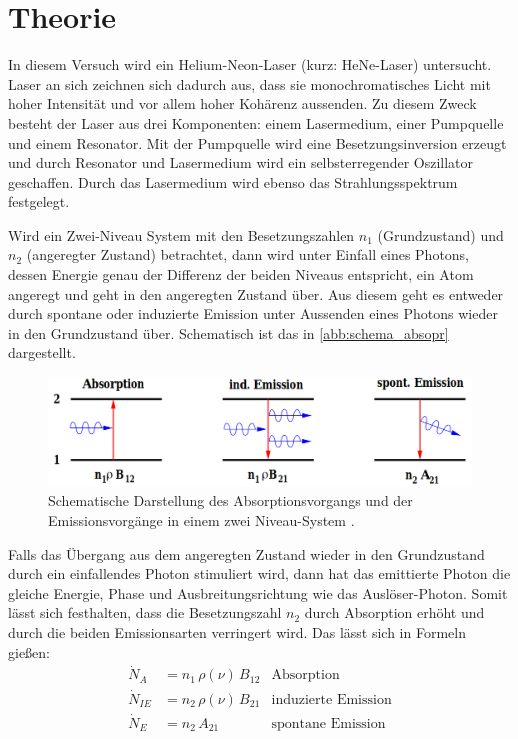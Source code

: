 \section{Theorie}

In diesem Versuch wird ein Helium-Neon-Laser (kurz: HeNe-Laser) untersucht.
Laser an sich zeichnen sich dadurch aus, dass sie monochromatisches Licht
mit hoher Intensität und vor allem hoher Kohärenz aussenden. Zu diesem Zweck besteht
der Laser aus drei Komponenten: einem Lasermedium, einer Pumpquelle und einem Resonator.
Mit der Pumpquelle wird eine Besetzungsinversion erzeugt und durch Resonator und Lasermedium
wird ein selbsterregender Oszillator geschaffen. Durch das Lasermedium wird ebenso
das Strahlungsspektrum festgelegt.

Wird ein Zwei-Niveau System mit den Besetzungszahlen $n_1$ (Grundzustand) und
$n_2$ (angeregter Zustand) betrachtet,
dann wird unter Einfall eines Photons, dessen Energie genau der Differenz der beiden
Niveaus entspricht, ein Atom angeregt und geht in den angeregten Zustand über.
Aus diesem geht es entweder durch spontane oder induzierte Emission unter
Aussenden eines Photons wieder in den
Grundzustand über. Schematisch ist das in \autoref{abb:schema_absopr} dargestellt.
\begin{figure}
  \centering
  \includegraphics[scale=0.4]{content/pics/schema_absorp.png}
  \caption{Schematische Darstellung des Absorptionsvorgangs und der Emissionsvorgänge
  in einem zwei Niveau-System \cite{anleitung}.}
  \label{abb:schema_absopr}
\end{figure}
Falls das Übergang aus dem angeregten Zustand wieder in den Grundzustand durch ein
einfallendes Photon stimuliert wird, dann hat das emittierte Photon die gleiche Energie,
Phase und Ausbreitungsrichtung wie das Auslöser-Photon. Somit lässt sich festhalten,
dass die Besetzungszahl $n_2$ durch Absorption erhöht und durch die beiden Emissionsarten
verringert wird. Das lässt sich in Formeln gießen:
\begin{align*}
  \dot{N}_A &= n_1 \, \rho(\nu) \, B_{12} &\text{Absorption} \\
  \dot{N}_{IE} &= n_2 \, \rho(\nu) \, B_{21} &\text{induzierte Emission} \\
  \dot{N}_E &= n_2 \, A_{21} &\text{spontane Emission}
\end{align*}
